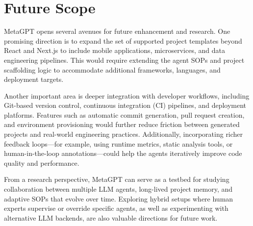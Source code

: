 
\chapter{Future Scope}

MetaGPT opens several avenues for future enhancement and research. One promising direction is to expand the set of supported project templates beyond React and Next.js to include mobile applications, microservices, and data engineering pipelines. This would require extending the agent SOPs and project scaffolding logic to accommodate additional frameworks, languages, and deployment targets.

Another important area is deeper integration with developer workflows, including Git-based version control, continuous integration (CI) pipelines, and deployment platforms. Features such as automatic commit generation, pull request creation, and environment provisioning would further reduce friction between generated projects and real-world engineering practices. Additionally, incorporating richer feedback loops---for example, using runtime metrics, static analysis tools, or human-in-the-loop annotations---could help the agents iteratively improve code quality and performance.

From a research perspective, MetaGPT can serve as a testbed for studying collaboration between multiple LLM agents, long-lived project memory, and adaptive SOPs that evolve over time. Exploring hybrid setups where human experts supervise or override specific agents, as well as experimenting with alternative LLM backends, are also valuable directions for future work.
